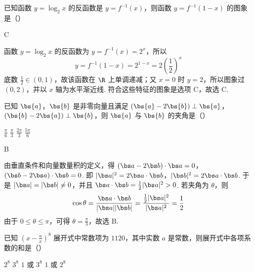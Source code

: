 \begin{problem}
已知函数 \(y = \log_{2} x\) 的反函数是 \(y = f^{-1}(x)\)，则函数 \(y = f^{-1}(1 - x)\) 的图象是（\quad）

    {}
    {}
    {}
\end{problem}

\begin{answer}
C
\end{answer}

\begin{solution}
函数 \(y=\log_2x\) 的反函数为 \(y=f^{-1}(x)=2^x\)，所以
\[
y=f^{-1}(1-x)=2^{1-x}=2\left(\frac12\right)^x
\]
底数 \(\frac12\in(0,1)\)，故该函数在 \(\R\) 上单调递减；又 \(x=0\) 时 \(y=2\)，所以图象过 \((0,2)\)，并以 \(x\) 轴为水平渐近线. 符合这些特征的图象是选项 C，故选 C.
\end{solution}

\begin{problem}
已知 \(\bs{a}\)，\(\bs{b}\) 是非零向量且满足 \((\bs{a} - 2\bs{b}) \perp \bs{a}\)，\((\bs{b} - 2\bs{a}) \perp \bs{b}\)，则 \(\bs{a}\) 与 \(\bs{b}\) 的夹角是（\quad）

\choices
    {\(\frac{\pi}{6}\)}
    {\(\frac{\pi}{3}\)}
    {\(\frac{2\pi}{3}\)}
    {\(\frac{5\pi}{6}\)}
\end{problem}

\begin{answer}
B
\end{answer}

\begin{solution}
由垂直条件和向量数量积的定义，得
\((\bs a-2\bs b)\cdot\bs a=0\)，\((\bs b-2\bs a)\cdot\bs b=0\).
即
\(|\bs a|^2=2\bs a\cdot\bs b\)，\(|\bs b|^2=2\bs a\cdot\bs b\).
于是 \(|\bs a|=|\bs b|\neq0\)，并且
\(\bs a\cdot\bs b=\frac12|\bs a|^2>0\). 若夹角为 \(\theta\)，则
\[
\cos\theta=\frac{\bs a\cdot\bs b}{|\bs a||\bs b|}
=\frac{\frac12|\bs a|^2}{|\bs a|^2}=\frac12
\]
由于 \(0\leq\theta\leq\pi\)，可得 \(\theta=\frac\pi3\)，故选 B.
\end{solution}

\begin{problem}
已知 \(\left(x - \frac{a}{x}\right)^{8}\) 展开式中常数项为 \(1120\)，其中实数 \(a\) 是常数，则展开式中各项系数的和是（\quad）

\choices
    {\(2^{8}\)}
    {\(3^{8}\)}
    {\(1\) 或 \(3^{8}\)}
    {\(1\) 或 \(2^{8}\)}
\end{problem}

